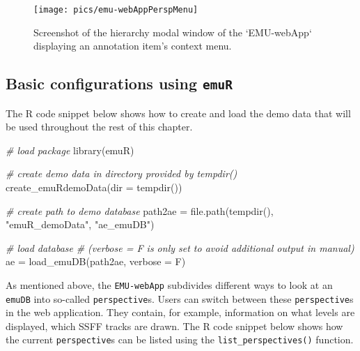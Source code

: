 \documentclass[
]{book}
\newenvironment{Shaded}{\begin{snugshade}}{\end{snugshade}}
\newcommand{\AttributeTok}[1]{\textcolor[rgb]{0.77,0.63,0.00}{#1}}
\newcommand{\CommentTok}[1]{\textcolor[rgb]{0.56,0.35,0.01}{\textit{#1}}}
\newcommand{\FunctionTok}[1]{\textcolor[rgb]{0.00,0.00,0.00}{#1}}
\newcommand{\NormalTok}[1]{#1}
\newcommand{\OtherTok}[1]{\textcolor[rgb]{0.56,0.35,0.01}{#1}}
\newcommand{\StringTok}[1]{\textcolor[rgb]{0.31,0.60,0.02}{#1}}
\begin{document}
\begin{figure}

{\centering \texttt{[image: pics/emu-webAppPerspMenu]} 

}

\caption{Screenshot of the hierarchy modal window of the `EMU-webApp` displaying an annotation item's context menu.}\label{fig:webApp-perspMenu}
\end{figure}

\hypertarget{subsec:emu-webAppConfigWithEmuR}{%
\subsection{\texorpdfstring{Basic configurations using \texttt{emuR}}{Basic configurations using emuR}}\label{subsec:emu-webAppConfigWithEmuR}}

The R code snippet below shows how to create and load the demo data that will be used throughout the rest of this chapter.

\begin{Shaded}
\begin{Highlighting}[]
\CommentTok{\# load package}
\FunctionTok{library}\NormalTok{(emuR)}

\CommentTok{\# create demo data in directory provided by tempdir()}
\FunctionTok{create\_emuRdemoData}\NormalTok{(}\AttributeTok{dir =} \FunctionTok{tempdir}\NormalTok{())}

\CommentTok{\# create path to demo database}
\NormalTok{path2ae }\OtherTok{=} \FunctionTok{file.path}\NormalTok{(}\FunctionTok{tempdir}\NormalTok{(), }\StringTok{"emuR\_demoData"}\NormalTok{, }\StringTok{"ae\_emuDB"}\NormalTok{)}

\CommentTok{\# load database}
\CommentTok{\# (verbose = F is only set to avoid additional output in manual)}
\NormalTok{ae }\OtherTok{=} \FunctionTok{load\_emuDB}\NormalTok{(path2ae, }\AttributeTok{verbose =}\NormalTok{ F)}
\end{Highlighting}
\end{Shaded}

As mentioned above, the \texttt{EMU-webApp} subdivides different ways to look at an \texttt{emuDB} into so-called \texttt{perspective}s. Users can switch between these \texttt{perspective}s in the web application. They contain, for example, information on what levels are displayed, which SSFF tracks are drawn. The R code snippet below shows how the current \texttt{perspective}s can be listed using the \texttt{list\_perspectives()} function.
\end{document}
